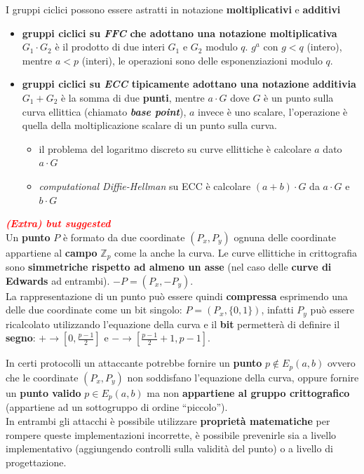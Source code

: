 \begin{flushleft}
    I gruppi ciclici possono essere astratti in notazione \textbf{moltiplicativi} e \textbf{additivi}
    \begin{itemize}[nosep]
        \item \textbf{gruppi ciclici su \textit{FFC} che adottano una notazione moltiplicativa} $G_1 \cdot G_2$ è il prodotto di due interi $G_1$ e $G_2$ modulo $q$. $g^a$ con $g < q$ (intero), mentre $a < p$ (interi), le operazioni sono delle esponenziazioni modulo $q$.
        \item \textbf{gruppi ciclici su \textit{ECC} tipicamente adottano una notazione additivia} $G_1 + G_2$ è la somma di due \textbf{punti}, mentre $a \cdot G$ dove $G$ è un punto sulla curva ellittica (chiamato \textbf{\textit{base point}}), $a$ invece è uno scalare, l'operazione è quella della moltiplicazione scalare di un punto sulla curva.
        \begin{itemize}[nosep]
            \item il problema del logaritmo discreto su curve ellittiche è calcolare $a$ dato $a \cdot G$
            \item \textit{computational Diffie-Hellman} su ECC è calcolare $(a + b) \cdot G$ da $a \cdot G$ e $b \cdot G$
        \end{itemize}
    \end{itemize}
    
    \smallskip

    \textcolor{red}{\textbf{\textit{(Extra) but suggested}}} \\
    Un \textbf{punto} $P$ è formato da due coordinate $(P_x, P_y)$ ognuna delle coordinate appartiene al \textbf{campo} $\mathbb{Z}_p$ come la anche la curva. Le curve ellittiche in crittografia sono \textbf{simmetriche rispetto ad almeno un asse} (nel caso delle \textbf{curve di Edwards} ad entrambi). $-P = (P_x, -P_y)$. \\
    La rappresentazione di un punto può essere quindi \textbf{compressa} esprimendo una delle due coordinate come un bit singolo: $P = (P_x, \{0, 1\})$, infatti $P_y$ può essere ricalcolato utilizzando l'equazione della curva e il \textbf{bit} permetterà di definire il \textbf{segno}: $+ \rightarrow [0, \frac{p - 1}{2}]$ e $- \rightarrow [\frac{p - 1}{2} + 1, p - 1]$.

    \smallskip

    In certi protocolli un attaccante potrebbe fornire un \textbf{punto} $p \notin E_p(a, b)$ ovvero che le coordinate $(P_x, P_y)$ non soddisfano l'equazione della curva, oppure fornire un \textbf{punto valido} $p \in E_p(a, b)$ ma non \textbf{appartiene al gruppo crittografico} (appartiene ad un sottogruppo di ordine ``piccolo''). \\
    In entrambi gli attacchi è possibile utilizzare \textbf{proprietà matematiche} per rompere queste implementazioni incorrette, è possibile prevenirle sia a livello implementativo (aggiungendo controlli sulla validità del punto) o a livello di progettazione.


\end{flushleft}
